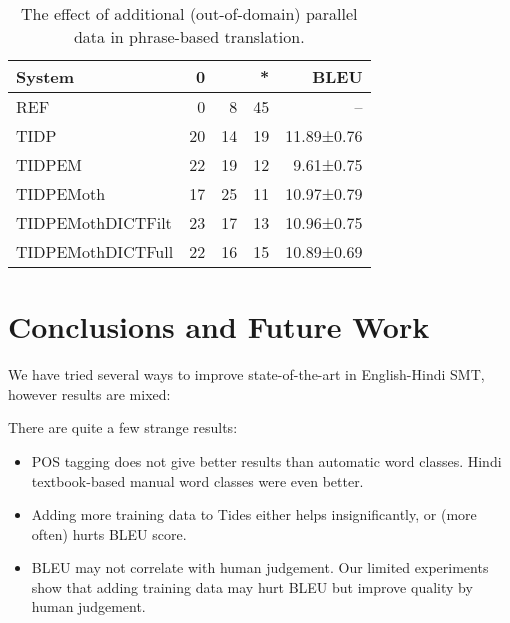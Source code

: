 \documentclass[11pt]{article}
\begin{document}
\begin{table}[ht]
\begin{small}
\begin{centering}
\begin{tabular}{l|r|r|r|r}
{\bf System} & {\bf 0} & {\bf *} & {\bf**} & {\bf BLEU}\\
\hline
REF         &  0 &          8   &   45   & -- \\
TIDP           &  20 &       14   &  19   &11.89±0.76\\
TIDPEM        &   22 &          19   &   12   &9.61±0.75\\
TIDPEMoth      &   17 &         25  &    11   & 10.97±0.79\\
TIDPEMothDICTFilt     &    23 &  17  &    13  & 10.96±0.75\\
TIDPEMothDICTFull    &    22 &   16  &    15  & 10.89±0.69 \\
\end{tabular}
\caption{The effect of additional (out-of-domain) parallel data in phrase-based
translation.}
\label{tab:human:more}
\end{centering}
\end{small}
\end{table}   


\section{Conclusions and Future Work}
\label{sec:concl}

We have tried several ways to improve state-of-the-art in English-Hindi SMT,
however results are mixed: 

There are quite a few strange results: 
\begin{itemize}
\item POS tagging does not give better results than automatic word classes.
Hindi textbook-based manual word classes were even better.
\item Adding more training data to Tides either helps insignificantly, or (more
often) hurts BLEU score. 
\item BLEU may not correlate with human judgement. Our limited experiments show
that adding training data may hurt BLEU but improve quality by human judgement.
\end{itemize}
\end{document}
